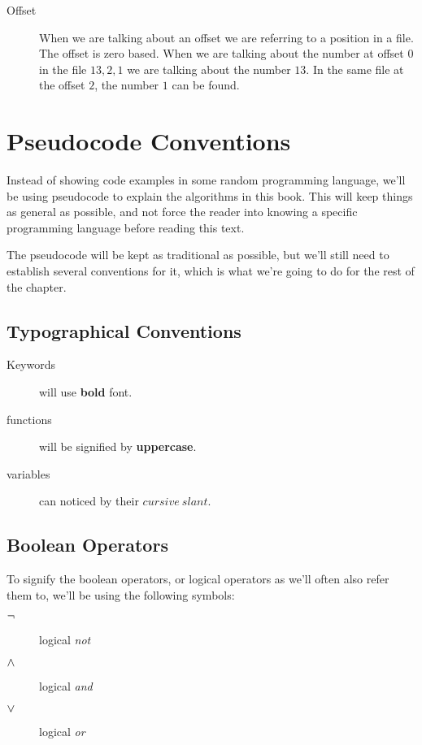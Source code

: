 \begin{description}
\item[Offset] When we are talking about an offset we are referring to
  a position in a file. The offset is zero based. When we are talking
  about the number at offset 0 in the file $13,2,1$ we are talking
  about the number $13$. In the same file at the offset $2$, the
  number $1$ can be found.

\end{description}

\section{Pseudocode Conventions}

Instead of showing code examples in some random programming language,
we'll be using pseudocode to explain the algorithms in this book. This
will keep things as general as possible, and not force the reader into
knowing a specific programming language before reading this text.

The pseudocode will be kept as traditional as possible, but we'll
still need to establish several conventions for it, which is what
we're going to do for the rest of the chapter.

\subsection{Typographical Conventions}

\begin{description}
\item[Keywords] will use \textbf{bold} font.
\item[functions] will be signified by \textbf{uppercase}.
\item[variables] can noticed by their $cursive\ slant$.
\end{description}

\subsection{Boolean Operators}
\label{sec:boolean-operators}

To signify the boolean operators, or logical operators as we'll often
also refer them to, we'll be using the following symbols:

\begin{description}
\item[$\neg$] logical \textit{not}
\item[$\wedge$] logical \textit{and}
\item[$\vee$] logical \textit{or}
\end{description}

